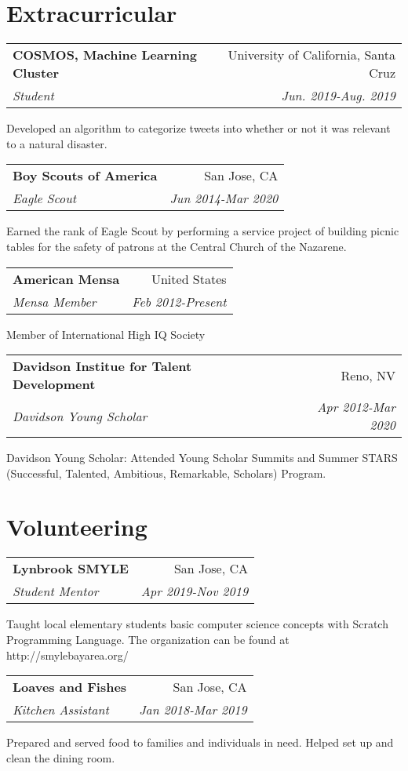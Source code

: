 \documentclass[letterpaper,11pt]{article}
\makeatletter
\newcommand{\resumeSubheading}[4]{
  \vspace{0.25em}
  \begin{tabular*}{0.97\textwidth}[t]{l@{\extracolsep{\fill}}r}
    \textbf{#1} & #2 \\
    \textit{\small#3} & \textit{\small #4} \\
  \end{tabular*}\vspace{0.25em}
}
\makeatother
\begin{document}
\section{Extracurricular}

\resumeSubheading{COSMOS, Machine Learning Cluster}
{University of California, Santa Cruz}{Student}{Jun. 2019-Aug. 2019}

Developed an algorithm to categorize tweets into whether or not it was relevant to a natural disaster.

\resumeSubheading{Boy Scouts of America}
{San Jose, CA}{Eagle Scout}{Jun 2014-Mar 2020}

Earned the rank of Eagle Scout by performing a service project of building picnic tables for the safety of patrons at the Central Church of the Nazarene.

\resumeSubheading{American Mensa}
{United States}{Mensa Member}{Feb 2012-Present}

Member of International High IQ Society

\resumeSubheading{Davidson Institue for Talent Development}
{Reno, NV}{Davidson Young Scholar}{Apr 2012-Mar 2020}

Davidson Young Scholar: Attended Young Scholar Summits and Summer STARS (Successful, Talented, Ambitious, Remarkable, Scholars) Program.

\section{Volunteering}

\resumeSubheading{Lynbrook SMYLE}
{San Jose, CA}{Student Mentor}{Apr 2019-Nov 2019}

Taught local elementary students basic computer science concepts with Scratch Programming Language. The organization can be found at http://smylebayarea.org/

\resumeSubheading{Loaves and Fishes}
{San Jose, CA}{Kitchen Assistant}{Jan 2018-Mar 2019}

Prepared and served food to families and individuals in need. Helped set up and clean the dining room.
\end{document}

